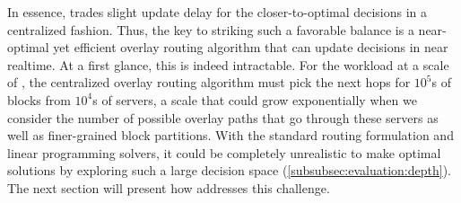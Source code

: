 In essence, \name trades slight update delay for the closer-to-optimal 
decisions in a centralized fashion. Thus, the key to striking such a 
favorable balance is a near-optimal yet efficient overlay routing 
algorithm that can update decisions in near realtime. At a first 
glance, this is indeed intractable. For the workload at a scale of 
\company, the centralized overlay routing algorithm must pick the next 
hops for $10^5$s of blocks from $10^4$s of servers, a scale that 
could grow exponentially when we consider the number of possible 
overlay paths that go through these servers as well as finer-grained 
block partitions. With the standard routing formulation and linear 
programming solvers, it could be completely unrealistic to make 
optimal solutions by exploring such a large decision space 
(\Section\ref{subsubsec:evaluation:depth}).
The next section will present how \name addresses this challenge.

